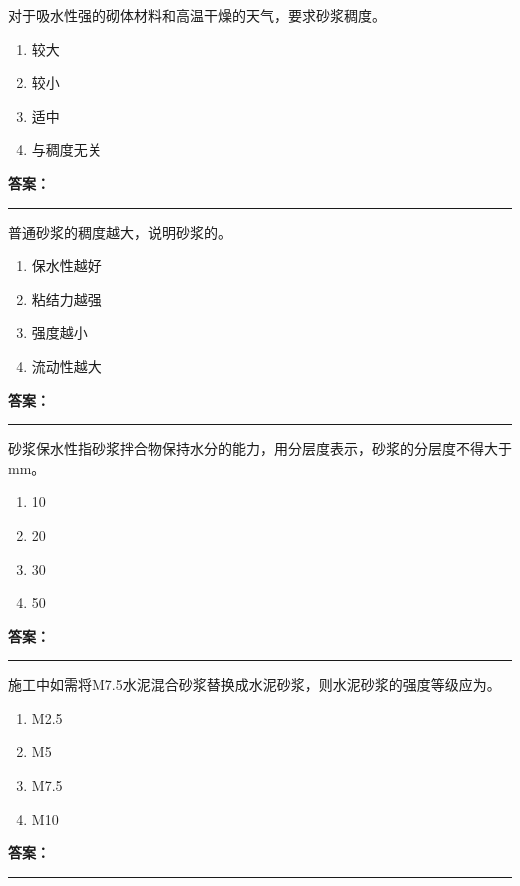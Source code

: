 \documentclass[UTF8,fontset=fandol,11pt]{ctexart}
\newcommand{\answerline}{\textcolor{answerred}{\rule{2.4cm}{0.7pt}}}
\begin{document}
\begin{quizbox}[title={第 3 题}]
对于吸水性强的砌体材料和高温干燥的天气，要求砂浆稠度。\\
\begin{enumerate}[label=\Alph*.]
\item 较大
\item 较小
\item 适中
\item 与稠度无关
\end{enumerate}
\textbf{\textcolor{answerred}{答案：}} \answerline
\end{quizbox}

\vspace{0.2em}

\begin{quizbox}[title={第 4 题}]
普通砂浆的稠度越大，说明砂浆的。\\
\begin{enumerate}[label=\Alph*.]
\item 保水性越好
\item 粘结力越强
\item 强度越小
\item 流动性越大
\end{enumerate}
\textbf{\textcolor{answerred}{答案：}} \answerline
\end{quizbox}

\vspace{0.2em}

\begin{quizbox}[title={第 5 题}]
砂浆保水性指砂浆拌合物保持水分的能力，用分层度表示，砂浆的分层度不得大于 mm。\\
\begin{enumerate}[label=\Alph*.]
\item 10
\item 20
\item 30
\item 50
\end{enumerate}
\textbf{\textcolor{answerred}{答案：}} \answerline
\end{quizbox}

\vspace{0.2em}

\begin{quizbox}[title={第 6 题}]
施工中如需将M7.5水泥混合砂浆替换成水泥砂浆，则水泥砂浆的强度等级应为。\\
\begin{enumerate}[label=\Alph*.]
\item M2.5
\item M5
\item M7.5
\item M10
\end{enumerate}
\textbf{\textcolor{answerred}{答案：}} \answerline
\end{quizbox}
\end{document}
